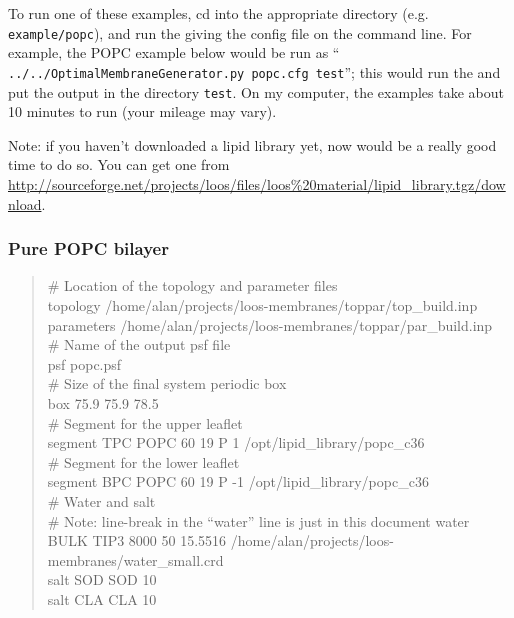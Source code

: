 \documentclass[12pt]{article}
\begin{document}
To run one of these examples, cd into the appropriate directory (e.g. {\tt
example/popc}), and run the {\omgwtf} giving the config file on the command
line.  For example, the POPC example below would be run as ``{\tt
../../OptimalMembraneGenerator.py popc.cfg test}''; this would run the
{\omgwtf} and put the output in the directory {\tt test}.  On my computer,
the examples take about 10 minutes to run (your mileage may vary).

Note: if you haven't downloaded a lipid library yet, now would be a really
good time to do so.  You can get one from
\url{http://sourceforge.net/projects/loos/files/loos\%20material/lipid_library.tgz/download}.
 


\subsubsection{Pure POPC bilayer}

\begin{quote}
\# Location of the topology and parameter files \\
topology /home/alan/projects/loos-membranes/toppar/top\_build.inp \\
parameters /home/alan/projects/loos-membranes/toppar/par\_build.inp \\

\# Name of the output psf file \\
psf      popc.psf \\

\# Size of the final system periodic box \\
box      75.9  75.9  78.5 \\

\# Segment for the upper leaflet \\
segment TPC       POPC     60    19    P 1      /opt/lipid\_library/popc\_c36
\\
\# Segment for the lower leaflet \\
segment BPC       POPC     60    19    P -1     /opt/lipid\_library/popc\_c36
\\

\# Water and salt \\
\# Note: line-break in the ``water'' line is just in this document
water   BULK     TIP3      8000       50      15.5516 /home/alan/projects/loos-membranes/water\_small.crd \\
salt    SOD       SOD      10 \\
salt    CLA       CLA      10 \\
\end{quote}
\end{document}
